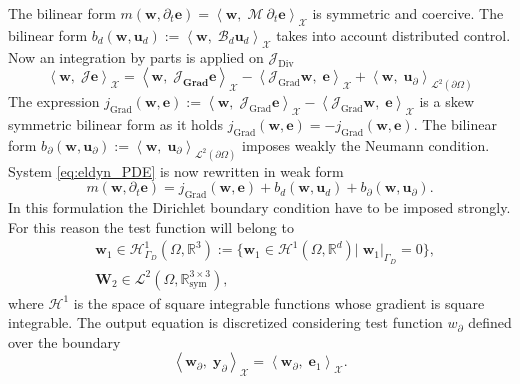 \documentclass{svjour3}                     %
\DeclareMathOperator*{\Grad}{Grad}
\DeclareMathOperator*{\Div}{Div}
\begin{document}
The bilinear form $m(\bm{w}, \partial_t \bm{e}) = \left\langle \bm{w}, \; \bm{\mathcal{M}} \ \partial_t \bm{e} \right\rangle_{\mathscr{X}}$ is symmetric and coercive. The bilinear form $b_d(\bm{w}, \bm{u}_d):=\left\langle \bm{w}, \; \bm{\mathcal{B}}_d \bm{u}_d \right\rangle_{\mathscr{X}}$ takes into account distributed control.\\
Now an integration by parts is applied on $\bm{\mathcal{J}}_{\Div}$
\begin{equation}
\left\langle \bm{w}, \; \bm{\mathcal{J}} \bm{e} \right\rangle_{\mathscr{X}} = \left\langle \bm{w}, \; \bm{\mathcal{J}_{\Grad}} \bm{e} \right\rangle_{\mathscr{X}} - \left\langle \bm{\mathcal{J}}_{\Grad} \bm{w}, \; \bm{e} \right\rangle_{\mathscr{X}} + \left\langle \bm{w}, \; \bm{u}_\partial \right\rangle_{\mathscr{L}^2(\partial \Omega)}
\end{equation}
The expression $j_{\Grad}(\bm{w}, \bm{e}) :=\left\langle \bm{w}, \; \bm{\mathcal{J}}_{\Grad} \bm{e} \right\rangle_{\mathscr{X}} - \left\langle \bm{\mathcal{J}}_{\Grad} \bm{w}, \; \bm{e} \right\rangle_{\mathscr{X}}$ is a skew symmetric bilinear form as it holds $j_{\Grad}(\bm{w}, \bm{e})=-j_{\Grad}(\bm{w}, \bm{e})$. The bilinear form $b_{\partial}(\bm{w}, \bm{u}_\partial) := \left\langle \bm{w}, \; \bm{u}_\partial \right\rangle_{\mathscr{L}^2(\partial \Omega)}$ imposes weakly the Neumann condition. System \eqref{eq:eldyn_PDE} is now rewritten in weak form
\begin{equation}
m(\bm{w}, \partial_t \bm{e}) = j_{\Grad}(\bm{w}, \bm{e}) + b_d(\bm{w}, \bm{u}_d) + b_{\partial}(\bm{w}, \bm{u}_\partial).
\end{equation}
In this formulation the Dirichlet boundary condition have to be imposed strongly. For this reason the test function will belong to
\begin{align*}
	&\bm{w}_1 \in \mathscr{H}^1_{\Gamma_D}(\Omega, \mathbb{R}^3) := \{\bm{w}_1 \in \mathscr{H}^1(\Omega, \mathbb{R}^d)|\;  \bm{w}_1|_{\Gamma_D} = 0  \}, \\
	&\bm{W}_2 \in \mathscr{L}^2(\Omega, \mathbb{R}^{3\times 3}_{\text{sym}}),
\end{align*} 
where $\mathscr{H}^1$ is the space of square integrable functions whose gradient is square integrable. The output equation is discretized considering test function $w_\partial$ defined over the boundary
\begin{equation}
\left\langle \bm{w}_\partial, \; \bm{y}_\partial \right\rangle_{\mathscr{X}} = \left\langle \bm{w}_\partial, \; \bm{e}_1 \right\rangle_{\mathscr{X}}.
\end{equation}
\end{document}

